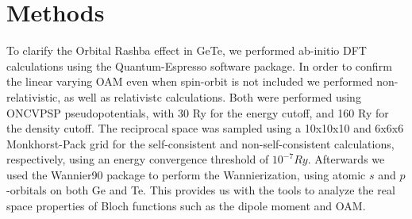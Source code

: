
\section{Methods}
To clarify the Orbital Rashba effect in GeTe, we performed ab-initio DFT calculations using the Quantum-Espresso software package\cite{Giannozzi2009}. In order to confirm the linear varying OAM even when spin-orbit is not included we performed non-relativistic, as well as relativistc calculations. Both were performed using ONCVPSP pseudopotentials, with 30 Ry for the energy cutoff, and 160 Ry for the density cutoff. The reciprocal space was sampled using a 10x10x10 and 6x6x6 Monkhorst-Pack grid for the self-consistent and non-self-consistent calculations, respectively, using an energy convergence threshold of $10^{-7}Ry$. Afterwards we used the Wannier90 package \cite{Mostofi2014AnFunctions} to perform the Wannierization, using atomic $s$ and $p$-orbitals on both Ge and Te. This provides us with the tools to analyze the real space properties of Bloch functions such as the dipole moment and OAM. 

